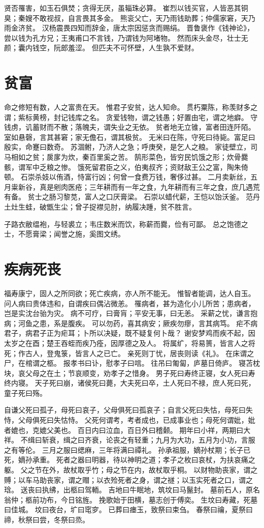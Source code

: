 \documentclass[12pt,UTF8]{ctexbook}
\begin{document}
贤否罹害，如玉石俱焚；贪得无厌，虽辎珠必算。
崔烈以钱买官，人皆恶其铜臭；秦嫂不敢视叔，自言畏其多金。
熊衮父亡，天乃雨钱助葬；仲儒家窘，天乃雨金济贫。
汉杨震畏四知而辞金，唐太宗因惩贪而赐绢。
晋鲁褒作《钱神论》，尝以钱为孔方兄；王夷甫口不言钱，乃谓钱为阿堵物。
然而床头金尽，壮士无颜；囊内钱空，阮郎羞涩。
但匹夫不可怀壁，人生孰不爱财。

\chapter{贫富}

命之修短有数，人之富贵在天。
惟君子安贫，达人知命。
贯朽粟陈，称羡财多之谓；紫标黄榜，封记钱库之名。
贪爱钱物，谓之钱愚；好置由宅，谓之地癖。
守钱虏，讥蓄财而不散；落魄夫，谓失业之无依。
贫者地无立锥，富者田连阡陌。
室如悬磬，言其甚窘；家无儋石，谓其极贫。
无米曰在陈，守死曰待毙。富足曰殷实，命蹇曰数奇。
苏涸鲋，乃济人之急；呼庚癸，是乞人之粮。
家徒壁立，司马相如之贫；扊扅为炊，秦百里奚之苦。
鹄形菜色，皆穷民饥饿之形；炊骨爨骸，谓军中乏粮之惨。
饿死留君臣之义，伯夷叔齐；资财敌王公之富，陶朱倚顿。
石崇杀妓以侑酒，恃富行凶；何曾一食费万钱，奢侈过甚。
二月卖新丝，五月粜新谷，真是剜肉医疮；三年耕而有一年之食，九年耕而有三年之食，庶几遇荒有备。
贫士之肠习黎苋，富人之口厌膏梁。
石崇以蜡代薪，王恺以饴沃釜。
范丹土灶生蛙，破甑生尘；曾子捉襟见肘，纳履决踵，贫不胜言。

子路衣敝缊袍，与轻裘立；韦庄数米而饮，称薪而爨，俭有可鄙。
总之饱德之士，不愿膏梁；闻誉之施，奚图文绣。

\chapter{疾病死丧}

福寿康宁，固人之所同欲；死亡疾病，亦人所不能无。
惟智者能调，达人自玉。
问人病曰贵体违和，自谓疾曰偶沾微恙。
罹病者，甚为造化小儿所苦；患病者，岂是实沈台骀为灾。
病不可疗，曰膏肓；平安无事，曰无恙。
采薪之忧，谦言抱病；河鱼之患，系是腹疾。
可以勿药，喜其病安；厥疾勿瘳，言其病笃。
疟不病君子，病君子正为疟耳；卜所以决疑，既不疑复何卜哉？
谢安梦鸡而疾不起，因太岁之在酉；楚王吞蛭而疾乃痊，因厚德之及人。
将属纩，将易篑，皆言人之将死；作古人，登鬼箓，皆言人之已亡。
亲死则丁忧，居丧则读《礼》。
在床谓之尸，在棺谓之柩。
报孝书曰讣，慰孝子曰唁。
往吊曰匍匐，庐墓日倚庐。
寝苫枕块，哀父母之在土；节哀顺变，劝孝子之惜身。
男子死曰寿终正寝，女人死曰寿终内寝。
天子死曰崩，诸侯死曰薨，大夫死曰卒，土人死曰不禄，庶人死曰死，童子死曰殇。

自谦父死曰孤子，母死曰哀子，父母俱死曰孤哀子；自言父死曰失怙，母死曰失恃，父母俱死曰失怙恃。
父死何谓考，考者成也，已成事业也；母死何谓妣，妣者媲也，克媲父美也。
百日内曰泣血，百日外曰稽颡。
期年曰小祥，两期曰大祥。
不缉曰斩衰，缉之曰齐衰，论丧之有轻重；九月为大功，五月为小功，言服之有等伦。
三月之服曰缌麻，三年将满曰禫礼。
孙承祖服，嫡孙杖期；长子已死，嫡孙承重。
死者之器曰明器，待以神明之道；孝子之枚曰哀杖，为扶哀痛之躯。
父之节在外，故杖取乎竹；母之节在内，故杖取乎桐。
以财物助丧家，谓之赙；以车马助丧家，谓之赗；以衣殓死者之身，谓之禭；以玉实死者之口，谓之琀。
送丧曰执绋，出柩曰驾輀。
吉地曰牛眠地，筑坟曰马鬣封。
墓前石人，原名翁仲；柩前功布，今日铭旌。
挽歌始于田横，墓志创于傅奕。
生坟曰寿藏，死墓曰佳城。
坟曰夜台，圹曰窀穸。
已葬曰瘗玉，致祭曰束刍。
春祭曰禴，夏祭曰禘，秋祭曰尝，冬祭曰烝。
\end{document}
